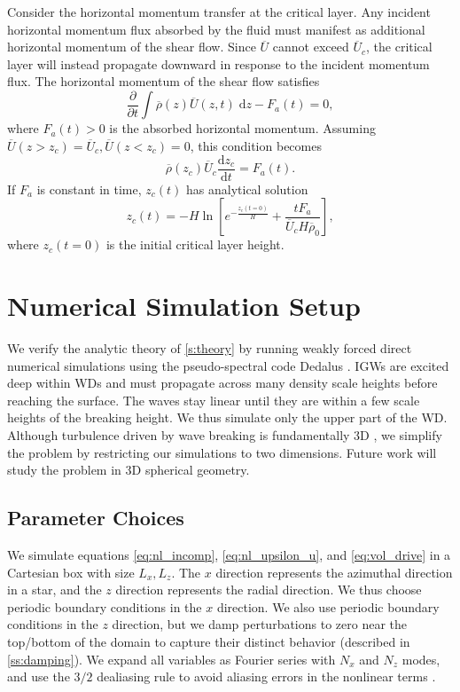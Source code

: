 \documentclass[
        fleqn,
        usenatbib,
        referee,
    ]{mnras}
\newcommand*{\rd}[2]{\frac{\mathrm{d}#1}{\mathrm{d}#2}}
\newcommand*{\pd}[2]{\frac{\partial#1}{\partial#2}}
\newcommand*{\s}[1]{\left[#1\right]}
\begin{document}
Consider the horizontal momentum transfer at the critical layer. Any incident
horizontal momentum flux absorbed by the fluid must manifest as additional
horizontal momentum of the shear flow. Since $\overline{U}$ cannot exceed
$\overline{U}_c$, the critical layer will instead propagate downward in response
to the incident momentum flux. The horizontal momentum of the shear flow
satisfies
\begin{equation}
    \pd{}{t}\int\limits \overline{\rho}(z) \overline{U}(z, t)\;\mathrm{d}z
        - F_a(t) = 0,
\end{equation}
where $F_a(t) > 0$ is the absorbed horizontal momentum. Assuming $\overline{U}(z
> z_c) = \overline{U}_c, \overline{U}(z < z_c) = 0$, this condition becomes
\begin{equation}
    \overline{\rho}(z_c) \overline{U}_c\rd{z_c}{t} = F_a(t).\label{eq:zc_anal}
\end{equation}
If $F_a$ is constant in time, $z_c(t)$ has analytical solution
\begin{equation}
    z_c(t) = -H\ln \s{e^{-\frac{z_c(t = 0)}{H}} +
        \frac{tF_a}{\overline{U}_c H\overline{\rho}_0}},\label{eq:zc_sol}
\end{equation}
where $z_c(t = 0)$ is the initial critical layer height.

\section{Numerical Simulation Setup}\label{s:numerics}

We verify the analytic theory of \autoref{s:theory} by running weakly forced
direct numerical simulations using the pseudo-spectral code Dedalus
\citep{dedalus,dedalus2}. IGWs are excited deep within WDs and must propagate
across many density scale heights before reaching the surface. The waves stay
linear until they are within a few scale heights of the breaking height. We thus
simulate only the upper part of the WD\@. Although turbulence driven by wave
breaking is fundamentally 3D \citep{klostermeyer}, we simplify the problem by
restricting our simulations to two dimensions. Future work will study the
problem in 3D spherical geometry.

\subsection{Parameter Choices}

We simulate equations \autoref{eq:nl_incomp}, \autoref{eq:nl_upsilon_u}, and
\autoref{eq:vol_drive} in a Cartesian box with size $L_x, L_z$. The $x$
direction represents the azimuthal direction in a star, and the $z$ direction
represents the radial direction. We thus choose periodic boundary conditions in
the $x$ direction. We also use periodic boundary conditions in the $z$
direction, but we damp perturbations to zero near the top/bottom of the domain
to capture their distinct behavior (described in \autoref{ss:damping}). We
expand all variables as Fourier series with $N_x$ and $N_z$ modes, and use the
$3/2$ dealiasing rule to avoid aliasing errors in the nonlinear terms
\citep{boyd}.
\end{document}
